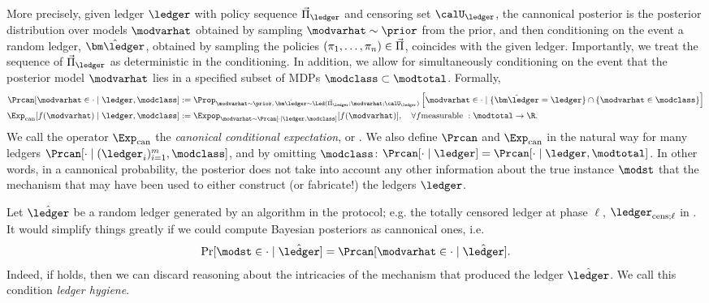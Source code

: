 More precisely, given ledger $\ledger$ with policy sequence $\Piseq_{\ledger}$ and censoring set $\calU_{\ledger}$, the cannonical posterior is the posterior distribution over models $\modvarhat$ obtained by sampling $\modvarhat \sim \prior$ from the prior, and then conditioning on the event a random ledger, $\hat{\ledvar}$, obtained by sampling the policies $(\pi_1,\dots,\pi_n) \in \vec{\Pi}$, coincides with the given ledger. Importantly, we treat the sequence of $\Piseq_{\ledger}$ as deterministic in the conditioning. In addition, we allow for simultaneously conditioning on the event that the posterior model $\modvarhat$ lies in a specified subset of MDPs $\modclass \subset \modtotal$. Formally,
\begin{align*}
\Prcan[ \modvarhat \in \cdot \mid \ledger ,\modclass] &:= \Prop_{\modvarhat \sim \prior, \, \hat{\ledvar} \sim \Led(\Piseq_{\ledger};\modvarhat;\calU_{\ledger}) } \left[ \modvarhat \in \cdot  \mid \{\hat{\ledvar} = \ledger  \} \cap \{\modvarhat \in \modclass\}\right]\\
\Expcan[f(\modvarhat)\mid \ledger , \modclass] &:= \Expop_{\modvarhat \sim \Prcan[ \cdot \mid \ledger, \modclass]}[f(\modvarhat)], \quad \forall f \text{measurable }: \modtotal \to \R.
\end{align*}
We call the operator $\Expcan$ the \emph{canonical conditional expectation}, or \cce. We also define $\Prcan$  and $\Expcan$ in the natural way for many ledgers $\Prcan[ \cdot \mid (\ledger_i)_{i=1}^m, \modclass]$, and by omitting $\modclass$: $\Prcan[ \cdot \mid \ledger]= \Prcan[\cdot \mid \ledger, \modtotal]$. In other words, in a cannonical probability, the posterior does not take into account any other information about the true instance $\modst$ that the mechanism that may have been used to either construct (or fabricate!) the ledgers $\ledger$.

Let $\hat{\ledger}$ be a random ledger generated by an algorithm in the protocol; e.g.  the totally censored ledger at phase $\ell$, $\ledcensl$ in . It would simplify things greatly if we could compute Bayesian posteriors as cannonical ones, i.e.
\begin{align}
 \Pr[\modst \in  \cdot \mid \hat{\ledger}]  = \Prcan[\modvarhat \in\cdot \mid \hat{\ledger} ]. \label{eq:hygeine}
\end{align}
Indeed, if  holds, then we can discard reasoning about the intricacies of the mechanism that produced the ledger $\hat{\ledger}$. We call this condition \emph{ledger hygiene}.

